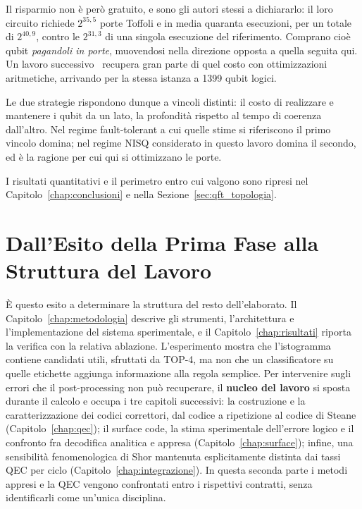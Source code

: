 \begin{onehalfspace}
Il risparmio non è però gratuito, e sono gli autori stessi a dichiararlo: il loro circuito
richiede $2^{35{,}5}$ porte Toffoli e in media quaranta esecuzioni, per un totale di
$2^{40{,}9}$, contro le $2^{31{,}3}$ di una singola esecuzione del riferimento. Comprano
cioè qubit \emph{pagandoli in porte}, muovendosi nella direzione opposta a quella seguita
qui. Un lavoro successivo~\cite{gidney2025} recupera gran parte di quel costo con
ottimizzazioni aritmetiche, arrivando per la stessa istanza a 1399 qubit logici.

Le due strategie rispondono dunque a vincoli distinti: il costo di realizzare e mantenere
i qubit da un lato, la profondità rispetto al tempo di coerenza dall'altro. Nel regime
fault-tolerant a cui quelle stime si riferiscono il primo vincolo domina; nel regime
\ac{NISQ} considerato in questo lavoro domina il secondo, ed è la ragione per cui qui si
ottimizzano le porte.

I risultati quantitativi e il perimetro entro cui valgono sono ripresi nel
Capitolo~\ref{chap:conclusioni} e nella Sezione~\ref{sec:qft_topologia}.

\section{Dall'Esito della Prima Fase alla Struttura del Lavoro}

È questo esito a determinare la struttura del resto dell'elaborato. Il Capitolo~\ref{chap:metodologia} descrive gli strumenti, l'architettura e l'implementazione del sistema sperimentale, e il Capitolo~\ref{chap:risultati} riporta la verifica con la relativa ablazione. L'esperimento mostra che l'istogramma contiene candidati utili, sfruttati da TOP-4, ma non che un classificatore su quelle etichette aggiunga informazione alla regola semplice. Per intervenire sugli errori che il post-processing non può recuperare, il \textbf{nucleo del lavoro} si sposta durante il calcolo e occupa i tre capitoli successivi: la costruzione e la caratterizzazione dei codici correttori, dal codice a ripetizione al codice di Steane (Capitolo~\ref{chap:qec}); il surface code, la stima sperimentale dell'errore logico e il confronto fra decodifica analitica e appresa (Capitolo~\ref{chap:surface}); infine, una sensibilità fenomenologica di Shor mantenuta esplicitamente distinta dai tassi QEC per ciclo (Capitolo~\ref{chap:integrazione}). In questa seconda parte i metodi appresi e la \ac{QEC} vengono confrontati entro i rispettivi contratti, senza identificarli come un'unica disciplina.

\end{onehalfspace}

